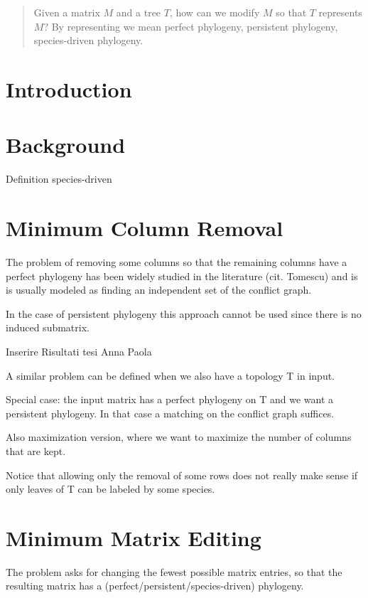 \begin{abstract}
Given a matrix $M$ and a tree $T$, how can we modify $M$ so that $T$ represents $M$?
By representing we mean perfect phylogeny, persistent phylogeny, species-driven phylogeny.
\end{abstract}
 
 
\section{Introduction}
\section{Background}
Definition species-driven


\section{Minimum Column Removal}


The problem of removing some columns so that the remaining columns have a perfect phylogeny has been widely studied in the literature (cit. Tomescu) and is is usually modeled as finding an independent set of the conflict graph.

In the case of persistent phylogeny this approach cannot be used since there is no induced submatrix.

Inserire Risultati tesi Anna Paola

A similar problem can be defined when we also have a topology T in input.

Special case: the input matrix has a perfect phylogeny on T and we want a persistent phylogeny. In that case a matching on the conflict graph suffices.

Also maximization version, where we want to maximize the number of columns that are kept.

Notice that allowing only the removal of some rows does not really make sense if only leaves of T can be labeled by some species.
\section{Minimum Matrix Editing}

The problem asks for changing the fewest possible matrix entries, so that the resulting matrix has a (perfect/persistent/species-driven) phylogeny.



